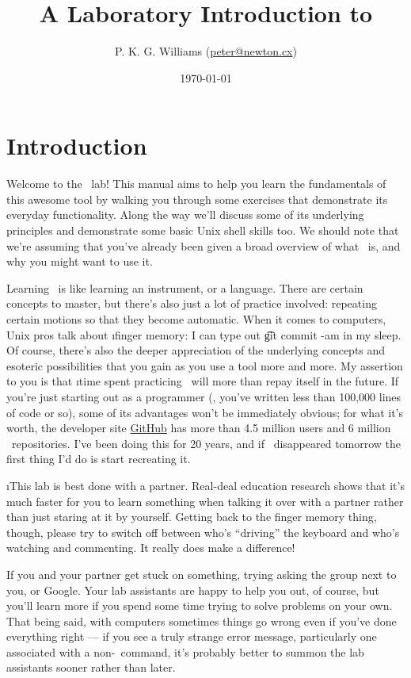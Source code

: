 \documentclass[letterpaper,12pt,titlepage]{article}
\title{A Laboratory Introduction to \git}
\author{P. K. G. Williams (\href{mailto:peter@newton.cx}{peter@newton.cx})}
\date{\today}
\begin{document}
\maketitle

\section*{Introduction}

Welcome to the \git\ lab! This manual aims to help you learn the fundamentals
of this awesome tool by walking you through some exercises that demonstrate
its everyday functionality. Along the way we'll discuss some of its underlying
principles and demonstrate some basic Unix shell skills too. We should note
that we're assuming that you've already been given a broad overview of what
\git\ is, and why you might want to use it.

Learning \git\ is like learning an instrument, or a language. There are
certain concepts to master, but there's also just a lot of practice involved:
repeating certain motions so that they become automatic. When it comes to
computers, Unix pros talk about \i{finger memory}: I can type out \t{git
  commit -am} in my sleep. Of course, there's also the deeper appreciation of
the underlying concepts and esoteric possibilities that you gain as you use a
tool more and more. My assertion to you is that \i{time spent practicing
  \git\ will more than repay itself in the future}. If you're just starting
out as a programmer (\ie, you've written less than 100,000 lines of code or
so), some of its advantages won't be immediately obvious; for what it's worth,
the developer site \href{https://github.com/}{GitHub} has more than 4.5
million users and 6 million \git\ repositories. I've been doing this for 20
years, and if \git\ disappeared tomorrow the first thing I'd do is start
recreating it.

\i{This lab is best done with a partner.} Real-deal education research shows
that it's much faster for you to learn something when talking it over with a
partner rather than just staring at it by yourself. Getting back to the finger
memory thing, though, please try to switch off between who's ``driving'' the
keyboard and who's watching and commenting. It really does make a difference!

If you and your partner get stuck on something, trying asking the group next
to you, or Google. Your lab assistants are happy to help you out, of course,
but you'll learn more if you spend some time trying to solve problems on your
own. That being said, with computers sometimes things go wrong even if you've
done everything right --- if you see a truly strange error message,
particularly one associated with a non-\git\ command, it's probably better to
summon the lab assistants sooner rather than later.
\end{document}
